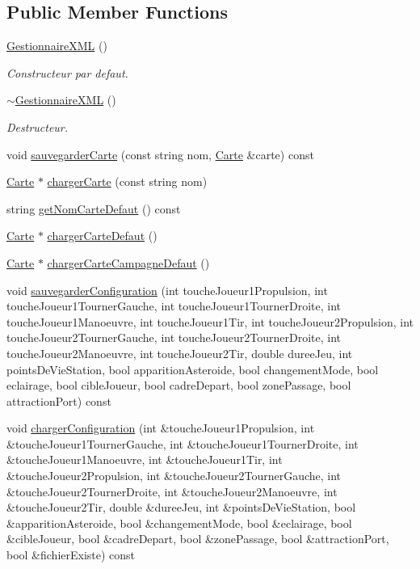 \subsection*{Public Member Functions}
\begin{DoxyCompactItemize}
\item 
\hyperlink{group__inf2990_ga267eebe0e3bb95b5d5f973a4319fe1da}{Gestionnaire\-X\-M\-L} ()
\begin{DoxyCompactList}\small\item\em Constructeur par defaut. \end{DoxyCompactList}\item 
\hyperlink{group__inf2990_gad8207e0a0791170d9c30e81be160ec73}{$\sim$\-Gestionnaire\-X\-M\-L} ()
\begin{DoxyCompactList}\small\item\em Destructeur. \end{DoxyCompactList}\item 
void \hyperlink{group__inf2990_ga84f9d09636d2edbbeb398da22274741d}{sauvegarder\-Carte} (const string nom, \hyperlink{class_carte}{Carte} \&carte) const 
\item 
\hyperlink{class_carte}{Carte} $\ast$ \hyperlink{group__inf2990_gaed7d668fdea387603e69c90f14766f97}{charger\-Carte} (const string nom)
\item 
string \hyperlink{group__inf2990_ga43004d2d9e045bae88d16024594e5cf3}{get\-Nom\-Carte\-Defaut} () const 
\item 
\hyperlink{class_carte}{Carte} $\ast$ \hyperlink{group__inf2990_ga9e8d745ff895e25d5d7bdf3a79ef2341}{charger\-Carte\-Defaut} ()
\item 
\hyperlink{class_carte}{Carte} $\ast$ \hyperlink{group__inf2990_ga9a4209b0cd0a7f296aca339a495f6c01}{charger\-Carte\-Campagne\-Defaut} ()
\item 
void \hyperlink{group__inf2990_ga2078e6964e0e3991cdc3926da825412d}{sauvegarder\-Configuration} (int touche\-Joueur1\-Propulsion, int touche\-Joueur1\-Tourner\-Gauche, int touche\-Joueur1\-Tourner\-Droite, int touche\-Joueur1\-Manoeuvre, int touche\-Joueur1\-Tir, int touche\-Joueur2\-Propulsion, int touche\-Joueur2\-Tourner\-Gauche, int touche\-Joueur2\-Tourner\-Droite, int touche\-Joueur2\-Manoeuvre, int touche\-Joueur2\-Tir, double duree\-Jeu, int points\-De\-Vie\-Station, bool apparition\-Asteroide, bool changement\-Mode, bool eclairage, bool cible\-Joueur, bool cadre\-Depart, bool zone\-Passage, bool attraction\-Port) const 
\item 
void \hyperlink{group__inf2990_ga74edda2c2220100dfa1a59b20291610b}{charger\-Configuration} (int \&touche\-Joueur1\-Propulsion, int \&touche\-Joueur1\-Tourner\-Gauche, int \&touche\-Joueur1\-Tourner\-Droite, int \&touche\-Joueur1\-Manoeuvre, int \&touche\-Joueur1\-Tir, int \&touche\-Joueur2\-Propulsion, int \&touche\-Joueur2\-Tourner\-Gauche, int \&touche\-Joueur2\-Tourner\-Droite, int \&touche\-Joueur2\-Manoeuvre, int \&touche\-Joueur2\-Tir, double \&duree\-Jeu, int \&points\-De\-Vie\-Station, bool \&apparition\-Asteroide, bool \&changement\-Mode, bool \&eclairage, bool \&cible\-Joueur, bool \&cadre\-Depart, bool \&zone\-Passage, bool \&attraction\-Port, bool \&fichier\-Existe) const 

\end{DoxyCompactItemize}
